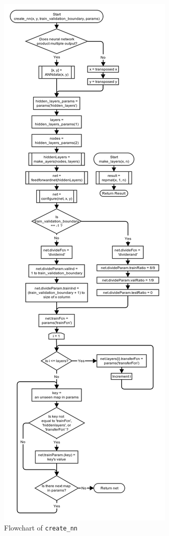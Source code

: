 \documentclass[10pt,a4paper]{article}
\begin{document}
\begin{figure}[!ht]
	\centering
	\includegraphics[scale=0.45]{images/flow_chart/create_nn.png}
	\caption{Flowchart of \tt{create\_nn}}
	\label{fig:create_nn}
\end{figure}
\end{document}

